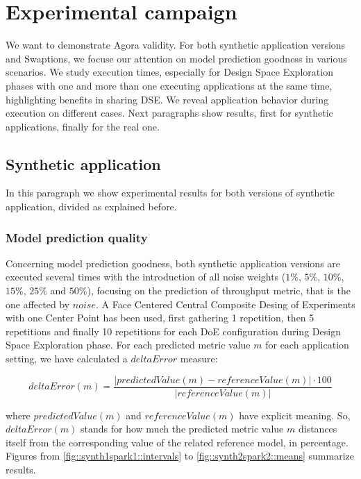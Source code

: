 \section{Experimental campaign}\label{campaign}

We want to demonstrate Agora validity. For both synthetic application versions and Swaptions, we focuse our attention on model prediction goodness in various scenarios. We study execution times, especially for Design Space Exploration phases with one and more than one executing applications at the same time, highlighting benefits in sharing DSE. We reveal application behavior during execution on different cases. Next paragraphs show results, first for synthetic applications, finally for the real one.


\subsection{Synthetic application}

In this paragraph we show experimental results for both versions of synthetic application, divided as explained before.


\subsubsection{Model prediction quality}\label{deltaErrorExplanation}

Concerning model prediction goodness, both synthetic application versions are executed several times with the introduction of all noise weights ($1\%$, $5\%$, $10\%$, $15\%$, $25\%$ and $50\%$), focusing on the prediction of throughput metric, that is the one affected by $noise$. A Face Centered Central Composite Desing of Experiments with one Center Point has been used, first gathering 1 repetition, then 5 repetitions and finally 10 repetitions for each DoE configuration during Design Space Exploration phase. For each predicted metric value $m$ for each application setting, we have calculated a $deltaError$ measure:

\[
deltaError(m) = \dfrac{\left\vert predictedValue(m) - referenceValue(m) \right\vert \cdot 100}{\left\vert referenceValue(m) \right\vert}
\]

where $predictedValue(m)$ and $referenceValue(m)$ have explicit meaning. So, $deltaError(m)$ stands for how much the predicted metric value $m$ distances itself from the corresponding value of the related reference model, in percentage. Figures from \ref{fig::synth1spark1::intervals} to \ref{fig::synth2spark2::means} summarize results.





